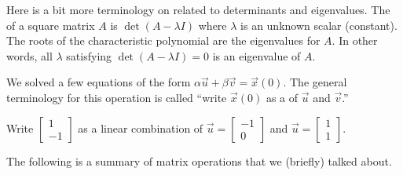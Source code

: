 \documentclass[../main.tex]{subfiles}
\begin{document}
\faStar{} Here is a bit more terminology on related to determinants and eigenvalues. The  of a square matrix \(A\) is \(\det(A - \lambda I)\) where \(\lambda\) is an unknown scalar (constant).  The roots of the characteristic polynomial are the eigenvalues for \(A\).  In other words, all \(\lambda\) satisfying \(\det(A - \lambda I) = 0\) is an eigenvalue of \(A\).

\faStar{} We solved a few equations of the form \(\alpha \vec{u} + \beta \vec{v} = \vec{x}(0)\). The general terminology for this operation is called ``write \(\vec{x}(0)\) as a  of \(\vec{u}\) and \(\vec{v}\).''

\begin{example}
  Write \(\begin{bmatrix} 1 \\ -1 \end{bmatrix}\) as a linear combination of \(\vec{u} = \begin{bmatrix} -1 \\ 0 \end{bmatrix}\) and \(\vec{u} = \begin{bmatrix} 1 \\ 1 \end{bmatrix}\). 

\end{example}

\faStar{} The following is a summary of matrix operations that we (briefly) talked about.
\end{document}
